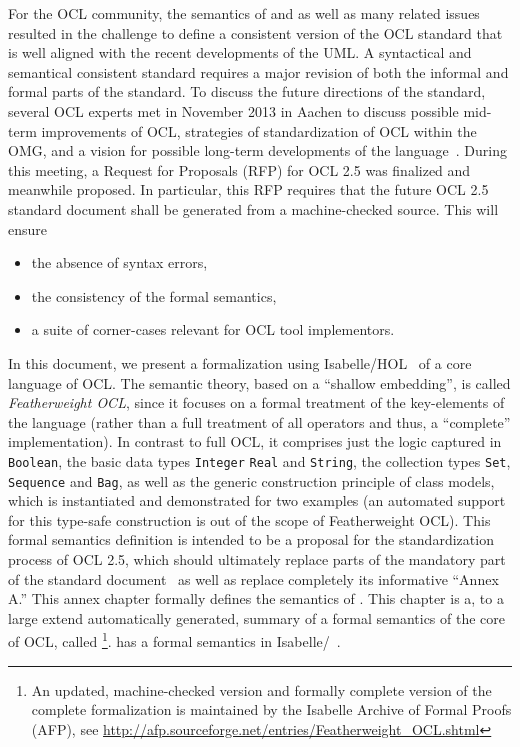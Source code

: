 For the OCL community, the semantics of  and
 as well as many related issues resulted in the
challenge to define a consistent version of the OCL standard that is
well aligned with the recent developments of the UML\@. A syntactical
and semantical consistent standard requires a major revision of both
the informal and formal parts of the standard. To discuss the future
directions of the standard, several OCL experts met in November 2013
in Aachen to discuss possible mid-term improvements of OCL, strategies
of standardization of OCL within the OMG, and a vision for possible
long-term developments of the
language~\cite{brucker.ea:summary-aachen:2013}. During this meeting, a
Request for Proposals (RFP) for OCL 2.5 was finalized and meanwhile
proposed. In particular, this RFP requires that the future OCL 2.5
standard document shall be generated from a machine-checked
source. This will ensure
\begin{itemize}
\item the absence of syntax errors,
\item the consistency of the formal semantics,
\item a suite of corner-cases relevant for OCL tool implementors.
\end{itemize}

In this document, we present a formalization using
Isabelle/HOL~\cite{nipkow.ea:isabelle:2002} of a core language of
OCL\@. The semantic theory, based on a ``shallow embedding'', is
called \emph{Featherweight OCL}, since it focuses on a formal
treatment of the key-elements of the language (rather than a full
treatment of all operators and thus, a ``complete''
implementation). In contrast to full OCL, it comprises just the logic
captured in \verb+Boolean+, the basic data types \verb+Integer+ \verb+Real+ and 
\verb+String+, the collection types \verb+Set+, \verb+Sequence+ and \verb+Bag+, 
as well as the generic construction principle of class models, which is 
instantiated and demonstrated for two examples (an automated support for 
this type-safe construction is out of the scope of Featherweight OCL).  
This formal semantics
definition is intended to be a proposal for the standardization
process of OCL 2.5, which should ultimately replace parts of the
mandatory part of the standard document~\cite{omg:ocl:2012} as well as
replace completely its informative ``Annex A.''
\endisatagafp
\isatagannexa
This annex chapter formally defines the semantics of \OCL\@. This
chapter is a, to a large extend automatically generated, summary of a
formal semantics of the core of OCL, called \FOCL\footnote{An updated,
  machine-checked version and formally complete version of the
  complete formalization is maintained by the Isabelle Archive of
  Formal Proofs (AFP), see
  \url{http://afp.sourceforge.net/entries/Featherweight_OCL.shtml}}. \FOCL
has a formal semantics in Isabelle/\HOL~\cite{nipkow.ea:isabelle:2002}.
\endisatagannexa

